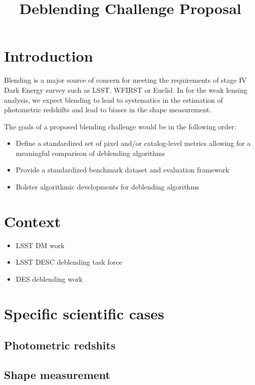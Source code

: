 \documentclass[10pt,letter]{article}
\title{\vspace{-2em} Deblending Challenge Proposal}
\author{}
\date{}
\begin{document}
\maketitle

\section*{Introduction}

Blending is a major source of concern for meeting the requirements of stage IV Dark Energy survey such as LSST, WFIRST or Euclid. In for the weak lensing analysis, we expect blending to lead to systematics in the estimation of photometric redshifts and lead to biases in the shape measurement. 

The goals of a proposed blending challenge would be in the following order:
    \begin{itemize}
        \item Define a standardized set of pixel and/or catalog-level metrics allowing for a meaningful comparison of deblending algorithms 
        \item Provide a standardized benchmark dataset and evaluation framework
        
        \item Bolster algorithmic developments for deblending algorithms
    \end{itemize}


\section{Context}

\begin{itemize}
    \item LSST DM work
    \item LSST DESC deblending task force
    \item DES deblending work
\end{itemize}

\section{Specific scientific cases}

\subsection{Photometric redshits}

\subsection{Shape measurement}
\end{document}
